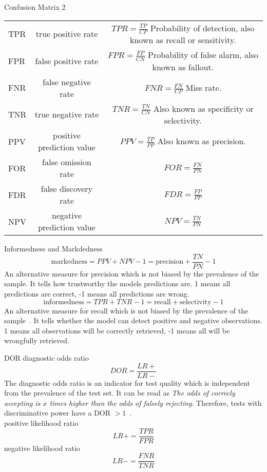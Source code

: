 \begin{frame}{Confusion Matrix 2}
  \begin{tabulary}{\textwidth}{ l C C }
     TPR & true positive rate        & \(TPR=\frac{TP}{CP}\) Probability of detection, also known as \gls{recall} or \gls{sensitivity}. \\
     FPR & false positive rate       & \(FPR=\frac{FP}{CN}\) Probability of false alarm, also known as \gls{fallout}. \\
     FNR & false negative rate       & \(FNR=\frac{FN}{CP}\) Miss rate. \\
     TNR & true negative rate        & \(TNR=\frac{TN}{CN}\) Also known as \gls{specificity} or \gls{selectivity}. \\
     PPV & positive prediction value & \(PPV=\frac{TP}{PP}\) Also known as \gls{precision}. \\
     FOR & false omission rate       & \(FOR=\frac{FN}{PN}\) \\
     FDR & false discovery rate      & \(FDR=\frac{FP}{PP}\) \\
     NPV & negative prediction value & \(NPV=\frac{TN}{PN}\) \\
  \end{tabulary}
\end{frame}
\begin{frame}{Informedness and Markdedness}
  		\[\text{markedness} = PPV+NPV-1 = \text{precision} + \frac{TN}{PN} - 1\]
  		An alternative measure for \gls{precision} which is not biased by the \gls{prevalence} of the sample. It tells how trustworthy the models predictions are. 1 means all predictions are correct, -1 means all predictions are wrong.
      \\ 
  		\[\text{informedness} = TPR+TNR-1 = \text{recall} + \text{selectivity} -1\]
  		An alternative measure for \gls{recall} which is not biased by the \gls{prevalence} of the sample~. It tells whether the model can detect positive and negative observations. 1 means all observations will be correctly retrieved, -1 means all will be wrongfully retrieved.
\end{frame}
\begin{frame}{DOR}
  \footnotesize
  diagnostic odds ratio
                \[DOR=\frac{LR+}{LR-}\]
        The diagnostic odds ratio is an indicator for test quality which is independent from the prevalence of the test set.
        It can be read as \emph{The odds of correcly accepting is \(x\) times higher than the odds of falsely rejecting}.
  Therefore, tests with discriminative power have a DOR \(>1\)~. \\
  positive likelihood ratio
  \[LR+=\frac{TPR}{FPR}\]
  negative likelihood ratio
  \[LR-=\frac{FNR}{TNR}\]
\end{frame}

